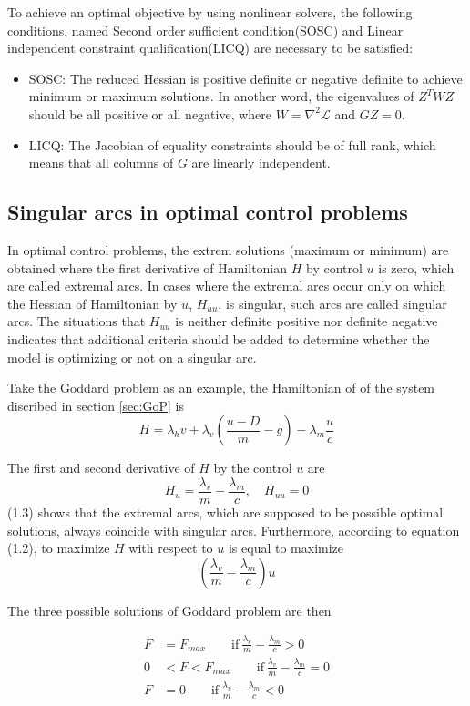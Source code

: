 \documentclass{article}
\begin{document}
To achieve an optimal objective by using nonlinear solvers, the following conditions, named Second order sufficient condition(SOSC) and Linear independent constraint qualification(LICQ) are necessary to be satisfied:

\begin{itemize}
    \item SOSC: The reduced Hessian is positive definite or negative definite to achieve minimum or maximum solutions. In another word, the eigenvalues of $Z^TWZ$ should be all positive or all negative, where $W=\nabla^2\mathcal{L}$ and $GZ=0$. 
    \item LICQ: The Jacobian of equality constraints should be of full rank, which means that all columns of $G$ are linearly independent.
\end{itemize}

\subsection{Singular arcs in optimal control problems}
\label{sec:Sing}
In optimal control problems, the extrem solutions (maximum or minimum) are obtained where the first derivative of Hamiltonian $H$ by control $u$ is zero, which are called extremal arcs\cite{Bryson}. In cases where the extremal arcs occur only on which the Hessian of Hamiltonian by $u$, $H_{uu}$, is singular, such arcs are called singular arcs. The situations that $H_{uu}$ is neither definite positive nor definite negative indicates that additional criteria should be added to determine whether the model is optimizing or not on a singular arc.

Take the Goddard problem as an example, the Hamiltonian of of the system discribed in section \ref{sec:GoP} is 
\[
H = \lambda_h v+ \lambda_v (\frac{u-D}{m}-g)- \lambda_m \frac{u}{c} \tag{1.2}
\]

The first and second derivative of $H$ by the control $u$ are
\[
H_u = \frac{\lambda_v}{m}-\frac{\lambda_m}{c} ,\quad H_{uu}=0 \tag{1.3}
\]
(1.3) shows that the extremal arcs, which are supposed to be possible optimal solutions, always coincide with singular arcs. Furthermore, according to equation (1.2), to maximize $H$ with respect to $u$ is equal to maximize
\[
(\frac{\lambda_v}{m}-\frac{\lambda_m}{c})u
\]

The three possible solutions of Goddard problem are then 

\begin{align*}
    F &= F_{max}  \qquad \text{if} \ \frac{\lambda_v}{m}-\frac{\lambda_m}{c}>0 \\
    0 &< F < F_{max} \qquad \text{if} \ \frac{\lambda_v}{m}-\frac{\lambda_m}{c}=0 \\
    F &= 0 \qquad \text{if} \ \frac{\lambda_v}{m}-\frac{\lambda_m}{c}<0
\end{align*}
\end{document}
